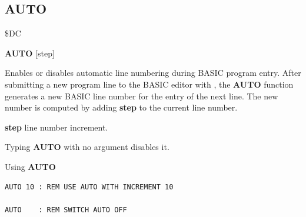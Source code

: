 \subsection{AUTO}
\begin{description}[leftmargin=2cm,style=nextline]
\item [Token:]    \$DC

\item [Format:]   {\bf AUTO} [step]

\item [Usage:]    Enables or disables automatic line numbering during BASIC program entry. After submitting a new program line to the BASIC editor with , the {\bf AUTO} function generates a new BASIC line number for the entry of the next line. The new number is computed by adding {\bf step} to the current line number.

                  {\bf step} line number increment.

                  Typing {\bf AUTO} with no argument disables it.

\item [Examples:] Using {\bf AUTO}

\begin{tcolorbox}[colback=black,coltext=white]
\verbatimfont{\codefont}
\begin{verbatim}
AUTO 10 : REM USE AUTO WITH INCREMENT 10

AUTO    : REM SWITCH AUTO OFF
\end{verbatim}
\end{tcolorbox}
\end{description}


\newpage
